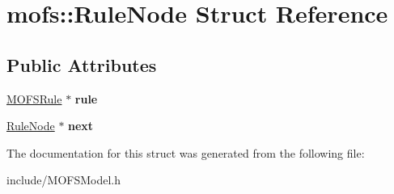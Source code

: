 \hypertarget{structmofs_1_1RuleNode}{\section{mofs\-:\-:Rule\-Node Struct Reference}
\label{structmofs_1_1RuleNode}
}
\subsection*{Public Attributes}
\begin{DoxyCompactItemize}
\item 
\hypertarget{structmofs_1_1RuleNode_ac96e062d87b84ce7ca9b8ec2871bf25d}{\hyperlink{classMOFSRule}{M\-O\-F\-S\-Rule} $\ast$ {\bfseries rule}}\label{structmofs_1_1RuleNode_ac96e062d87b84ce7ca9b8ec2871bf25d}

\item 
\hypertarget{structmofs_1_1RuleNode_a974ce31287addb178dff150228926c49}{\hyperlink{structmofs_1_1RuleNode}{Rule\-Node} $\ast$ {\bfseries next}}\label{structmofs_1_1RuleNode_a974ce31287addb178dff150228926c49}

\end{DoxyCompactItemize}


The documentation for this struct was generated from the following file\-:\begin{DoxyCompactItemize}
\item 
include/M\-O\-F\-S\-Model.\-h\end{DoxyCompactItemize}
